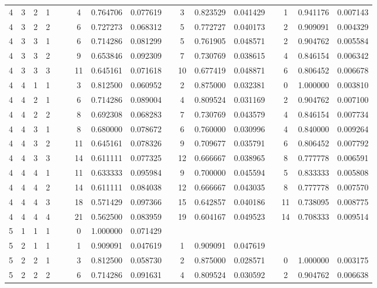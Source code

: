 \begin{appendix}
\begin{longtable}[h]{rrrcccccccccccccc}
4	&	3	&	2	&	1	&&&	4	&	0.764706	&	0.077619	&&	3	&	0.823529	&	0.041429	&&	1	&	0.941176	&	0.007143	\\
4	&	3	&	2	&	2	&&&	6	&	0.727273	&	0.068312	&&	5	&	0.772727	&	0.040173	&&	2	&	0.909091	&	0.004329	\\
4	&	3	&	3	&	1	&&&	6	&	0.714286	&	0.081299	&&	5	&	0.761905	&	0.048571	&&	2	&	0.904762	&	0.005584	\\
4	&	3	&	3	&	2	&&&	9	&	0.653846	&	0.092309	&&	7	&	0.730769	&	0.038615	&&	4	&	0.846154	&	0.006342	\\
4	&	3	&	3	&	3	&&&	11	&	0.645161	&	0.071618	&&	10	&	0.677419	&	0.048871	&&	6	&	0.806452	&	0.006678	\\
4	&	4	&	1	&	1	&&&	3	&	0.812500	&	0.060952	&&	2	&	0.875000	&	0.032381	&&	0	&	1.000000	&	0.003810	\\
4	&	4	&	2	&	1	&&&	6	&	0.714286	&	0.089004	&&	4	&	0.809524	&	0.031169	&&	2	&	0.904762	&	0.007100	\\
4	&	4	&	2	&	2	&&&	8	&	0.692308	&	0.068283	&&	7	&	0.730769	&	0.043579	&&	4	&	0.846154	&	0.007734	\\
4	&	4	&	3	&	1	&&&	8	&	0.680000	&	0.078672	&&	6	&	0.760000	&	0.030996	&&	4	&	0.840000	&	0.009264	\\
4	&	4	&	3	&	2	&&&	11	&	0.645161	&	0.078326	&&	9	&	0.709677	&	0.035791	&&	6	&	0.806452	&	0.007792	\\
4	&	4	&	3	&	3	&&&	14	&	0.611111	&	0.077325	&&	12	&	0.666667	&	0.038965	&&	8	&	0.777778	&	0.006591	\\
4	&	4	&	4	&	1	&&&	11	&	0.633333	&	0.095984	&&	9	&	0.700000	&	0.045594	&&	5	&	0.833333	&	0.005808	\\
4	&	4	&	4	&	2	&&&	14	&	0.611111	&	0.084038	&&	12	&	0.666667	&	0.043035	&&	8	&	0.777778	&	0.007570	\\
4	&	4	&	4	&	3	&&&	18	&	0.571429	&	0.097366	&&	15	&	0.642857	&	0.040186	&&	11	&	0.738095	&	0.008775	\\
4	&	4	&	4	&	4	&&&	21	&	0.562500	&	0.083959	&&	19	&	0.604167	&	0.049523	&&	14	&	0.708333	&	0.009514	\\
5	&	1	&	1	&	1	&&&	0	&	1.000000	&	0.071429	&&		&		&		&&		&		&		\\
5	&	2	&	1	&	1	&&&	1	&	0.909091	&	0.047619	&&	1	&	0.909091	&	0.047619	&&		&		&		\\
5	&	2	&	2	&	1	&&&	3	&	0.812500	&	0.058730	&&	2	&	0.875000	&	0.028571	&&	0	&	1.000000	&	0.003175	\\
5	&	2	&	2	&	2	&&&	6	&	0.714286	&	0.091631	&&	4	&	0.809524	&	0.030592	&&	2	&	0.904762	&	0.006638	\\

\end{longtable}
\end{appendix}
